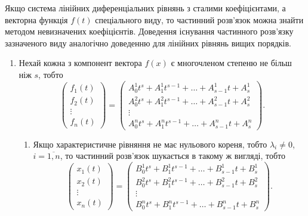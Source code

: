Якщо система лінійних диференціальних рівнянь з сталими коефіцієнтами, а векторна функція $f(t)$ спеціального виду, то частинний розв'язок можна знайти методом невизначених коефіцієнтів. Доведення існування частинного розв'язку зазначеного виду аналогічно доведенню для лінійних рівнянь вищих порядків.

\begin{enumerate}
	\item Нехай кожна з компонент вектора $f(x)$ є многочленом степеню не більш ніж $s$, тобто
	\begin{equation*}
		\begin{pmatrix} f_1(t) \\ f_2(t) \\ \vdots \\ f_n(t) \end{pmatrix} =
		\begin{pmatrix} A_0^1 t^s + A_1^1 t^{s - 1} + \ldots + A_{s - 1}^1 t + A_s^1 \\ A_0^2 t^s + A_1^2 t^{s - 1} + \ldots + A_{s - 1}^2 t + A_s^2 \\ \vdots \\ A_0^n t^s + A_1^n t^{s - 1} + \ldots + A_{s - 1}^n t + A_s^n \end{pmatrix}.
	\end{equation*}

	\begin{enumerate}
		\item Якщо характеристичне рівняння не має нульового кореня, тобто $\lambda_i \ne 0$, $i = \overline{1, n}$, то частинний розв'язок шукається в такому ж вигляді, тобто
		\begin{equation*}
			\begin{pmatrix} x_1(t) \\ x_2(t) \\ \vdots \\ x_n(t) \end{pmatrix} =
			\begin{pmatrix} B_0^1 t^s + B_1^1 t^{s - 1} + \ldots + B_{s - 1}^1 t + B_s^1 \\ B_0^2 t^s + B_1^2 t^{s - 1} + \ldots + B_{s - 1}^2 t + B_s^2 \\ \vdots \\ B_0^n t^s + B_1^n t^{s - 1} + \ldots + B_{s - 1}^n t + B_s^n \end{pmatrix}.
		\end{equation*}


\end{enumerate}
\end{enumerate}
